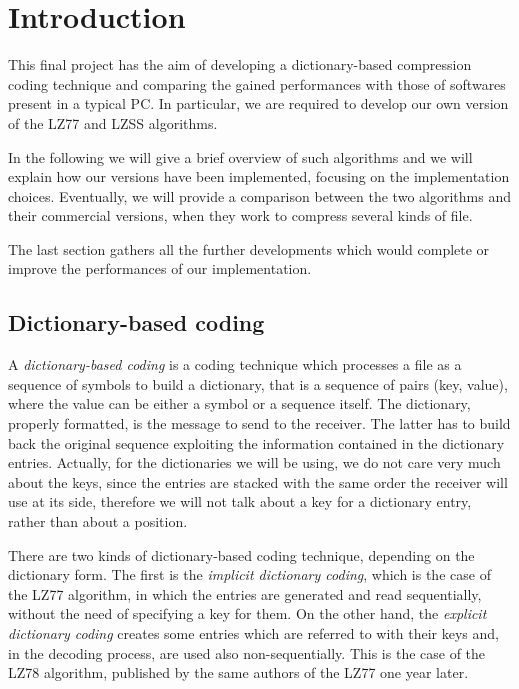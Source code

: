\section{Introduction}
This final project has the aim of developing a dictionary-based compression coding technique and comparing the gained performances with those of softwares present in a typical PC. In particular, we are required to develop our own version of the LZ77 and LZSS algorithms.

In the following we will give a brief overview of such algorithms and we will explain how our versions have been implemented, focusing on the implementation choices. Eventually, we will provide a comparison between the two algorithms and their commercial versions, when they work to compress several kinds of file.

The last section gathers all the further developments which would complete or improve the performances of our implementation.

\subsection{Dictionary-based coding} \label{subsec:dict-base}
A \textit{dictionary-based coding} is a coding technique which processes a file as a sequence of symbols to build a dictionary, that is a sequence of pairs (key, value), where the value can be either a symbol or a sequence itself. The dictionary, properly formatted, is the message to send to the receiver. The latter has to build back the original sequence exploiting the information contained in the dictionary entries. Actually, for the dictionaries we will be using, we do not care very much about the keys, since the entries are stacked with the same order the receiver will use at its side, therefore we will not talk about a key for a dictionary entry, rather than about a position.

There are two kinds of dictionary-based coding technique, depending on the dictionary form. The first is the \textit{implicit dictionary coding}, which is the case of the LZ77 algorithm, in which the entries are generated and read sequentially, without the need of specifying a key for them. On the other hand, the \textit{explicit dictionary coding} creates some entries which are referred to with their keys and, in the decoding process, are used also non-sequentially. This is the case of the LZ78 algorithm, published by the same authors of the LZ77 one year later.



